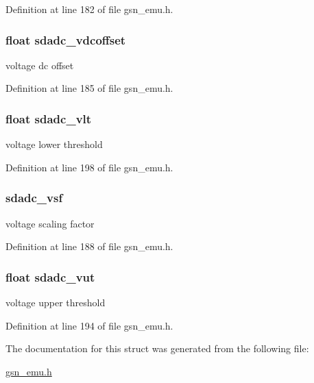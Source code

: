 Definition at line 182 of file gsn\_\-emu.h.

\hypertarget{a00058_a1f0888134ba8ec9b9f4aba86affe7f92}{
\subsubsection[{sdadc\_\-vdcoffset}]{\setlength{\rightskip}{0pt plus 5cm}float {\bf sdadc\_\-vdcoffset}}}
\label{a00058_a1f0888134ba8ec9b9f4aba86affe7f92}
voltage dc offset 

Definition at line 185 of file gsn\_\-emu.h.

\hypertarget{a00058_aef6392f3eeeb4ef56a69377a6d976db0}{
\subsubsection[{sdadc\_\-vlt}]{\setlength{\rightskip}{0pt plus 5cm}float {\bf sdadc\_\-vlt}}}
\label{a00058_aef6392f3eeeb4ef56a69377a6d976db0}
voltage lower threshold 

Definition at line 198 of file gsn\_\-emu.h.

\hypertarget{a00058_a1df73737dd7e55463686398514031c48}{
\subsubsection[{sdadc\_\-vsf}]{ {\bf sdadc\_\-vsf}}}
\label{a00058_a1df73737dd7e55463686398514031c48}
voltage scaling factor 

Definition at line 188 of file gsn\_\-emu.h.

\hypertarget{a00058_a5be38a8bca520ac56073318cb93607dc}{
\subsubsection[{sdadc\_\-vut}]{\setlength{\rightskip}{0pt plus 5cm}float {\bf sdadc\_\-vut}}}
\label{a00058_a5be38a8bca520ac56073318cb93607dc}
voltage upper threshold 

Definition at line 194 of file gsn\_\-emu.h.



The documentation for this struct was generated from the following file:\begin{DoxyCompactItemize}
\item 
\hyperlink{a00489}{gsn\_\-emu.h}\end{DoxyCompactItemize}
